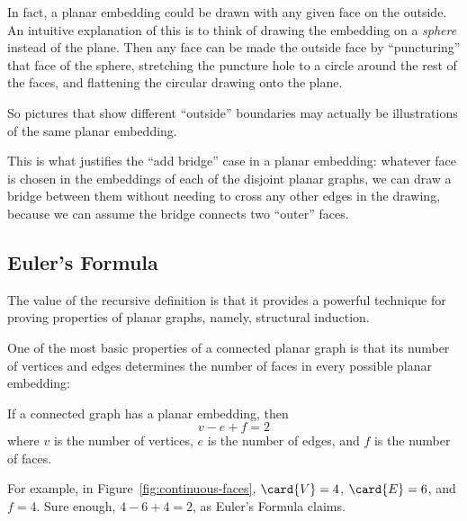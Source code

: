 In fact, a planar embedding could be drawn with any given face on the
outside.  An intuitive explanation of this is to think of drawing the
embedding on a \emph{sphere} instead of the plane.  Then any face can be
made the outside face by ``puncturing'' that face of the sphere,
stretching the puncture hole to a circle around the rest of the faces,
and flattening the circular drawing onto the plane.

So pictures that show different ``outside'' boundaries may actually be
illustrations of the same planar embedding.

This is what justifies the ``add bridge'' case in a planar embedding:
whatever face is chosen in the embeddings of each of the disjoint planar
graphs, we can draw a bridge between them without needing to cross any
other edges in the drawing, because we can assume the bridge connects
two ``outer'' faces.

\subsection{Euler's Formula}

The value of the recursive definition is that it provides a powerful
technique for proving properties of planar graphs, namely, structural
induction.

One of the most basic properties of a connected planar graph is that its
number of vertices and edges determines the number of faces in every
possible planar embedding:

\begin{theorem}
If a connected graph has a planar embedding, then
%
\[
v - e + f = 2
\]
%
where $v$ is the number of vertices, $e$ is the number of edges, and
$f$ is the number of faces.
\end{theorem}

For example, in Figure~\ref{fig:continuous-faces}, $\card{V} = 4$,
$\card{E} = 6$, and $f = 4$.  Sure enough, $4 - 6 + 4 = 2$, as Euler's
Formula claims.


